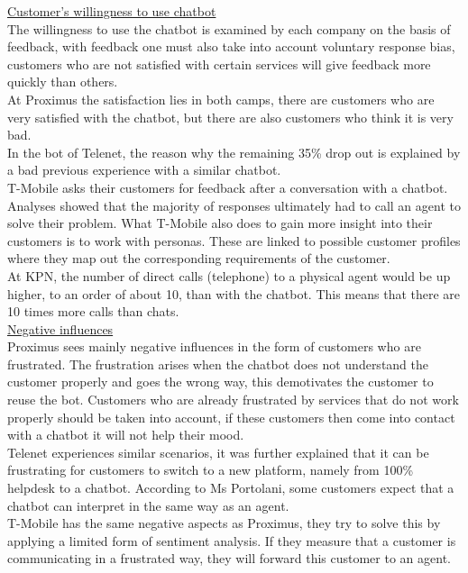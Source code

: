 \break
\ul{Customer's willingness to use chatbot}\\
The willingness to use the chatbot is examined by each company on the basis of feedback, with feedback one must also take into account voluntary response bias, customers who are not satisfied with certain services will give feedback more quickly than others.\\
\break
At Proximus the satisfaction lies in both camps, there are customers who are very satisfied with the chatbot, but there are also customers who think it is very bad.\\ 
\break
In the bot of Telenet, the reason why the remaining 35\% drop out is explained by a bad previous experience with a similar chatbot.\\ 
\break
T-Mobile asks their customers for feedback after a conversation with a chatbot. Analyses showed that the majority of responses ultimately had to call an agent to solve their problem. What T-Mobile also does to gain more insight into their customers is to work with personas. These are linked to possible customer profiles where they map out the corresponding requirements of the customer.\\ 
\break
At KPN, the number of direct calls (telephone) to a physical agent would be up higher, to an order of about 10, than with the chatbot. This means that there are 10 times more calls than chats.\\
\break
\ul{Negative influences}\\
Proximus sees mainly negative influences in the form of customers who are frustrated. The frustration arises when the chatbot does not understand the customer properly and goes the wrong way, this demotivates the customer to reuse the bot. Customers who are already frustrated by services that do not work properly should be taken into account, if these customers then come into contact with a chatbot it will not help their mood.\\
\break
Telenet experiences similar scenarios, it was further explained that it can be frustrating for customers to switch to a new platform, namely from 100\% helpdesk to a chatbot. According to Ms Portolani, some customers expect that a chatbot can interpret in the same way as an agent.\\
\break
T-Mobile has the same negative aspects as Proximus, they try to solve this by applying a limited form of sentiment analysis. If they measure that a customer is communicating in a frustrated way, they will forward this customer to an agent.\\
